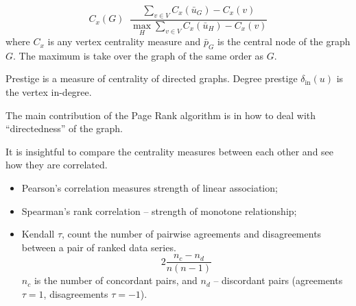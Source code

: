\documentclass[a4paper]{article}
\newcommand{\defn}{\mathop{\overset{\Delta}{=}}\nolimits}
\begin{document}
\[C_x(G) \defn \frac{\sum_{v\in V} C_x(\bar{u}_G) - C_x(v) }{\max_H \sum_{v\in V} C_x(\bar{u}_H) - C_x(v)}\]
where $C_x$ is any vertex centrality measure and $\bar{p}_G$ is the central node of the graph $G$. The maximum is take over the graph of the same order as $G$.

Prestige is a measure of centrality of directed graphs.
Degree prestige $\delta_{\text{in}}(u)$ is the vertex in-degree.

The main contribution of the Page Rank algorithm is in how to deal with ``directedness'' of the graph.

It is insightful to compare the centrality measures between each other and see how they are correlated.
\begin{itemize}
	\item Pearson's correlation measures strength of linear association;
	\item Spearman's rank correlation -- strength of monotone relationship;
	\item Kendall $\tau$, count the number of pairwise agreements and disagreements between a pair of ranked data series. 
	\[2\frac{n_c - n_d}{n(n-1)}\]
	$n_c$ is the number of concordant pairs, and $n_d$ -- discordant pairs (agreements $\tau=1$, disagreements $\tau=-1$).
\end{itemize}

\end{document}
